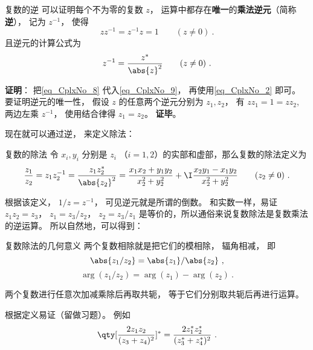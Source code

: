 \begin{definition}{复数的逆}
可以证明每个不为零的复数 $z$， 运算中都存在\textbf{唯一}的\textbf{乘法逆元}（简称\textbf{逆}）， 记为 $z^{-1}$， 使得
\begin{equation}\label{eq_CplxNo_9}
zz^{-1} = z^{-1}z = 1 \qquad (z \ne 0)~.
\end{equation}
且逆元的计算公式为
\begin{equation}\label{eq_CplxNo_8}
z^{-1} = \frac{z^*}{\abs{z}^2} \qquad (z \ne 0)~.
\end{equation}
\end{definition}
\textbf{证明}： 把\autoref{eq_CplxNo_8} 代入\autoref{eq_CplxNo_9}， 再使用\autoref{eq_CplxNo_2} 即可。 要证明逆元的唯一性， 假设 $z$ 的任意两个逆元分别为 $z_1, z_2$， 有 $zz_1 = 1 = zz_2$, 两边左乘 $z^{-1}$， 使用结合律得 $z_1 = z_2$。 \textbf{证毕}。

现在就可以通过逆， 来定义除法：
\begin{definition}{复数的除法}
令 $x_i,y_i$ 分别是 $z_i$ （$i=1,2$）的实部和虚部，那么复数的除法定义为
\begin{equation}\label{eq_CplxNo_7}
\frac{z_1}{z_2} = z_1z_2^{-1} = \frac{z_1z_2^*}{\abs{z_2}^2} = \frac{x_1 x_2 + y_1 y_2}{x_2^2 + y_2^2} + \I \frac{x_2 y_1 - x_1 y_2}{x_2^2 + y_2^2} \qquad (z_2 \ne 0)~.
\end{equation}
\end{definition}
根据该定义， $1/z = z^{-1}$， 可见逆元就是所谓的倒数。 和实数一样，易证 $z_1z_2 = z_3$， $z_1 = z_3/z_2$， $z_2 = z_3/z_1$ 是等价的，所以通俗来说复数除法是复数乘法的逆运算。 所以自然地，可以得到：

\begin{corollary}{复数除法的几何意义}
两个复数相除就是把它们的模相除， 辐角相减， 即
\begin{equation}
\abs{z_1/z_2} = \abs{z_1}/\abs{z_2}~,
\end{equation}
\begin{equation}
\arg(z_1/z_2) = \arg(z_1) - \arg(z_2)~.
\end{equation}
\end{corollary}

\begin{theorem}{}\label{the_CplxNo_1}
两个复数进行任意次加减乘除后再取共轭， 等于它们分别取共轭后再进行运算。
\end{theorem}
根据定义易证（留做习题）。 例如
\begin{equation}
\qty[\frac{2 z_1 z_2}{(z_3 + z_4)^2}]^* = \frac{2 z_1^* z_2^*}{(z_3^* + z_4^*)^2}~.
\end{equation}

